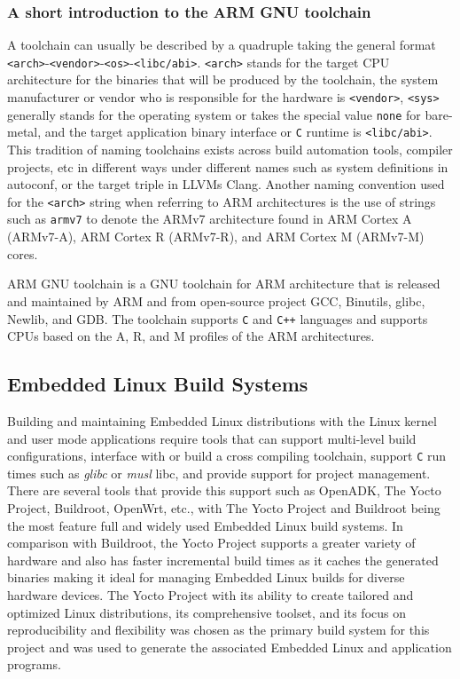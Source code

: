 \subsubsection{A short introduction to the ARM GNU toolchain}

A toolchain can usually be described by a quadruple taking the general format \texttt{<arch>}-\texttt{<vendor>}-\texttt{<os>}-\texttt{<libc/abi>}. \texttt{<arch>} stands for the target CPU architecture for the binaries that will be produced by the toolchain, the system manufacturer or vendor who is responsible for the hardware is \texttt{<vendor>}, \texttt{<sys>} generally stands for the operating system or takes the special value \texttt{none} for bare-metal, and the target application binary interface or \texttt{C} runtime is \texttt{<libc/abi>}. This tradition of naming toolchains exists across build automation tools, compiler projects, etc in different ways under different names such as system definitions in autoconf, or the target triple in LLVM\textquotesingle s Clang. Another naming convention used for the \texttt{<arch>} string when referring to ARM architectures is the use of strings such as \texttt{armv7} to denote the ARMv7 architecture found in ARM Cortex A (ARMv7-A), ARM Cortex R (ARMv7-R), and ARM Cortex M (ARMv7-M) cores.

ARM GNU toolchain is a GNU toolchain for ARM architecture that is released and maintained by ARM and from open-source project GCC, Binutils, glibc, Newlib, and GDB. The toolchain supports \texttt{C} and \texttt{C++} languages and supports CPUs based on the A, R, and M profiles of the ARM architectures.

\subsection{Embedded Linux Build Systems}

Building and maintaining Embedded Linux distributions with the Linux kernel and user mode applications require tools that can support multi-level build configurations, interface with or build a cross compiling toolchain, support \texttt{C} run times such as \textit{glibc} or \textit{musl} libc, and provide support for project management. There are several tools that provide this support such as OpenADK, The Yocto Project, Buildroot, OpenWrt, etc., with The Yocto Project and Buildroot being the most feature full and widely used Embedded Linux build systems. In comparison with Buildroot, the Yocto Project supports a greater variety of hardware and also has faster incremental build times as it caches the generated binaries \cite{yocto} making it ideal for managing Embedded Linux builds for diverse hardware devices. The Yocto Project with its ability to create tailored and optimized Linux distributions, its comprehensive toolset, and its focus on reproducibility and flexibility was chosen as the primary build system for this project and was used to generate the associated Embedded Linux and application programs.

